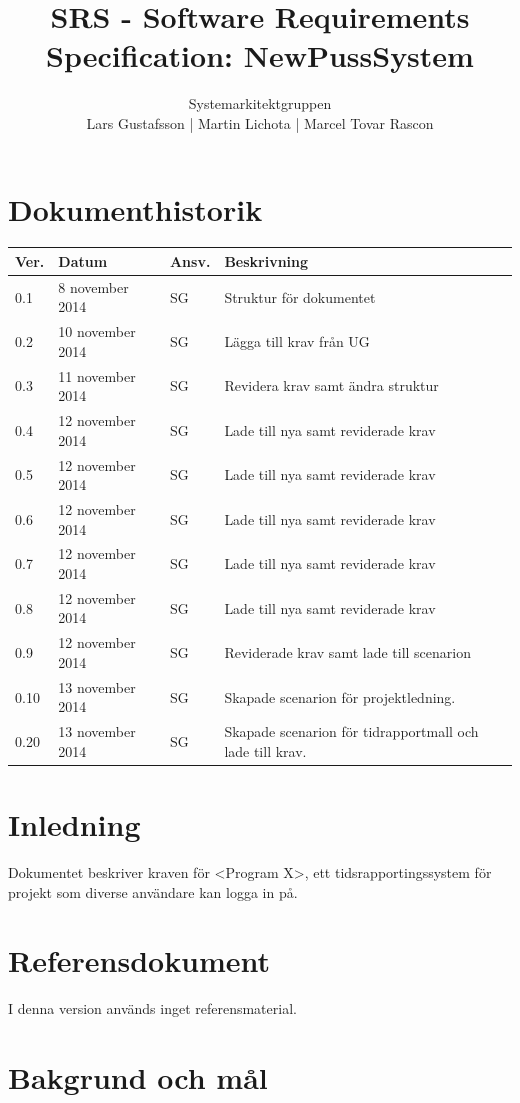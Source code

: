 \documentclass[a4paper]{article}
\title{SRS - Software Requirements Specification: NewPussSystem}
\author{Systemarkitektgruppen \\ Lars Gustafsson | Martin Lichota | Marcel Tovar Rascon}
\date{}
\begin{document}
\maketitle
\thispagestyle{fancy}
\tableofcontents
\newpage

\section*{Dokumenthistorik}

\begin{tabular}{ l l l l }
Ver. & Datum & Ansv. & Beskrivning \\\hline
0.1 & 8 november 2014 & SG & Struktur för dokumentet\\
0.2 & 10 november 2014 & SG & Lägga till krav från UG\\
0.3 & 11 november 2014 & SG & Revidera krav samt ändra struktur\\
0.4 & 12 november 2014 & SG & Lade till nya samt reviderade krav\\
0.5 & 12 november 2014 & SG & Lade till nya samt reviderade krav\\
0.6 & 12 november 2014 & SG & Lade till nya samt reviderade krav\\
0.7 & 12 november 2014 & SG & Lade till nya samt reviderade krav\\
0.8 & 12 november 2014 & SG & Lade till nya samt reviderade krav\\
0.9 & 12 november 2014 & SG & Reviderade krav samt lade till scenarion\\
0.10 & 13 november 2014 & SG & Skapade scenarion för projektledning.\\
0.20 & 13 november 2014 & SG & Skapade scenarion för tidrapportmall och lade till krav.\\
\end{tabular}
\section{Inledning}       


Dokumentet beskriver kraven för <Program X>, ett tidsrapportingssystem för projekt som diverse användare kan logga in på.

\section{Referensdokument}
I denna version används inget referensmaterial.
\section{Bakgrund och mål}   
\end{document}
